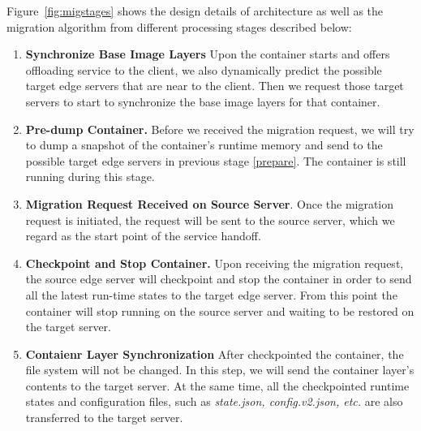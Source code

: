 


Figure~\ref{fig:migstages} shows the design details of architecture as well as the migration algorithm from different processing stages described below:

\begin{enumerate}[label=\textbf{S\arabic*}]

\item \label{prepare} \textbf{%
Synchronize Base Image Layers} Upon the container starts and offers offloading service to the client, we also dynamically predict the possible target edge servers that are near to the client. Then we request those target servers to start to synchronize the base image layers for that container. 

\item \label{predump} \textbf{Pre-dump Container.} Before we received the migration request, we will try to dump a snapshot of the container's runtime memory and send to the possible target edge servers in previous stage \ref{prepare}. The container is still running during this stage. %

\item \label{request}\textbf{Migration Request Received on Source Server}. Once the migration request is initiated, the request will be sent to the source server, which we regard as the start point of the service handoff.


\item \label{checkpoint} \textbf{Checkpoint and Stop Container.} Upon receiving the migration request, the source edge server will checkpoint and stop the container in order to send all the latest run-time states to the target edge server.
From this point the container will stop running on the source server and waiting to be restored on the target server.

\item \label{fs-sync} \textbf{Contaienr Layer Synchronization} After checkpointed the container, the file system will not be changed. In this step, we will send the container layer's contents to the target server. At the same time, all the checkpointed runtime states and configuration files, such as \textit{state.json, config.v2.json, etc.} are also transferred to the target server. 


\end{enumerate}
